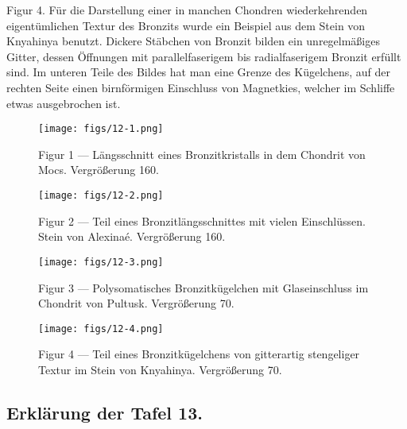 \documentclass[a4paper, 11pt, oneside, polutonikogreek, german]{article}
\begin{document}
Figur 4. Für die Darstellung einer in manchen Chondren wiederkehrenden eigentümlichen Textur des Bronzits wurde ein Beispiel aus dem Stein von Knyahinya benutzt. Dickere Stäbchen von Bronzit bilden ein unregelmäßiges Gitter, dessen Öffnungen mit parallelfaserigem bis radialfaserigem Bronzit erfüllt sind. Im unteren Teile des Bildes hat man eine Grenze des Kügelchens, auf der rechten Seite einen birnförmigen Einschluss von Magnetkies, welcher im Schliffe etwas ausgebrochen ist.
\clearpage

\vspace*{\fill}
\begin{figure}[H]
\centering
\texttt{[image: figs/12-1.png]}
\caption{\small Figur 1 --- Längsschnitt eines Bronzitkristalls in dem Chondrit von Mocs. Vergrößerung 160.}
\end{figure}
\vspace*{\fill}
\clearpage

\vspace*{\fill}
\begin{figure}[H]
\centering
\texttt{[image: figs/12-2.png]}
\caption{\small Figur 2 --- Teil eines Bronzitlängsschnittes mit vielen Einschlüssen. Stein von Alexinaé. Vergrößerung 160.}
\end{figure}
\vspace*{\fill}
\clearpage

\vspace*{\fill}
\begin{figure}[H]
\centering
\texttt{[image: figs/12-3.png]}
\caption{\small Figur 3 --- Polysomatisches Bronzitkügelchen mit Glaseinschluss im Chondrit von Pultusk. Vergrößerung 70.}
\end{figure}
\vspace*{\fill}
\clearpage

\vspace*{\fill}
\begin{figure}[H]
\centering
\texttt{[image: figs/12-4.png]}
\caption{\small Figur 4 --- Teil eines Bronzitkügelchens von gitterartig stengeliger Textur im Stein von Knyahinya. Vergrößerung 70.}
\end{figure}
\vspace*{\fill}
\clearpage

\subsection{Erklärung der Tafel 13.}
\end{document}
